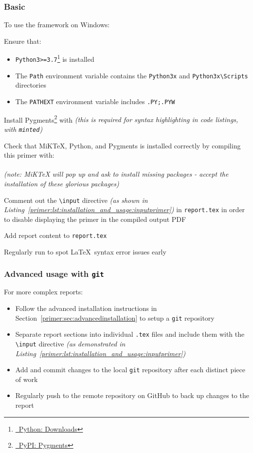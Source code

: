 \subsubsection{Basic}
To use the \uswdwmspkg{} framework on Windows:
\begin{methodology0}
  \item Ensure that:
    \begin{itemize}
      \item \texttt{Python3>=3.7}\footnote{\href{https://www.python.org/downloads/}{\faPython\ Python: Downloads}} is installed
      \item The \texttt{Path} environment variable contains the \texttt{Python3x} and \texttt{Python3x\textbackslash Scripts} directories
      \item The \texttt{PATHEXT} environment variable includes \texttt{.PY;.PYW}
    \end{itemize}
  \item Install Pygments\footnote{\href{https://pypi.org/project/Pygments/}{\faPython\ PyPI: Pygments}} with  \textit{(this is required for syntax highlighting in code listings, with \texttt{minted})}
  \item Check that MiKTeX, Python, and Pygments is installed correctly by compiling this primer with:\\
   \\
   \textit{(note: MiKTeX will pop up and ask to install missing packages - accept the installation of these glorious packages)}
  \item Comment out the \texttt{\textbackslash input} directive \textit{(as shown in Listing~\ref{primer:lst:installation_and_usage:inputprimer})} in \texttt{report.tex} in order to disable displaying the primer in the compiled output PDF
  \item Add report content to \texttt{report.tex}
  \item Regularly run  to spot \LaTeX\ syntax error issues early
\end{methodology0}

\subsubsection{Advanced usage with \texttt{git}}
For more complex reports:
\begin{itemize}
  \item Follow the advanced installation instructions in Section~\ref{primer:sec:advancedinstallation} to setup a \texttt{git} repository
  \item Separate report sections into individual \texttt{.tex} files and include them with the \texttt{\textbackslash input} directive \textit{(as demonstrated in Listing~\ref{primer:lst:installation_and_usage:inputprimer})}
  \item Add and commit changes to the local \texttt{git} repository after each distinct piece of work
  \item Regularly push to the remote repository on GitHub to back up changes to the report
\end{itemize}

